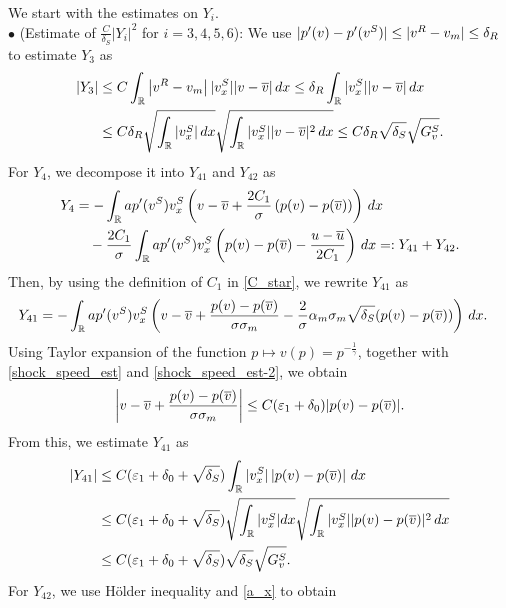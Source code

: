 \documentclass[11pt,reqno]{amsart}
\begin{document}
We start with the estimates on $Y_i$.\\

\noindent $\bullet$ (Estimate of $\frac{C}{\delta_S} |Y_i|^2$ for $i=3,4,5,6$): We use $|p'(v)-p'(v^S)| \le |v^R-v_m| \le \delta_R  $ to estimate $Y_3$ as
\begin{align*}
    |Y_3| &\le C \int_\mathbb{R} \left| v^R-v_m \right| |v^S_x| |v-\overline{v}| \, dx  \le \delta_R \int_\mathbb{R} |v^S_x||v-\overline{v}| \, dx \\ 
    &\le C \delta_R \sqrt{\int_\mathbb{R} |v^S_x| \, dx}\sqrt{\int_\mathbb{R} |v^S_x| |v-\overline{v}|^2 \, dx } \le C \delta_R \sqrt{\delta_S}\sqrt{G^S_v }.
\end{align*}
For $Y_4$, we decompose it into $Y_{41}$ and $Y_{42}$ as
\begin{align*}
     Y_4 
     &=-\int_\mathbb{R} a p'(v^S)v^S_x \left(v-\overline{v}+\frac{2C_1}{\sigma} \left( p(v)-p(\overline{v}) \right) \right) \,dx \\&\quad -\frac{2C_1}{\sigma}\int_\mathbb{R} a p'(v^S) v^S_x \left(p(v)-p(\overline{v}) - \frac{u-\overline{u}}{2C_1}\right) \, dx =:Y_{41}+Y_{42}.
\end{align*}
Then, by using the definition of $C_1$ in \eqref{C_star}, we rewrite $Y_{41}$ as
\begin{align*}
    Y_{41} &= - \int_\mathbb{R} ap'(v^S)v^S_x \left( v-\overline{v}+\frac{p(v)-p(\overline{v})}{\sigma\sigma_m}-\frac{2}{\sigma}\alpha_m\sigma_m \sqrt{\delta_S}(p(v)-p(\overline{v})) \right) \, dx. 
\end{align*}
Using Taylor expansion of the function $p \mapsto v(p)=p^{-\frac{1}{\gamma}}$, together with \eqref{shock_speed_est} and \eqref{shock_speed_est-2}, we obtain
\[\left| v-\overline{v}+\frac{p(v)-p(\overline{v})}{\sigma\sigma_m}\right|\le C(\varepsilon_1+\delta_0)|p(v)-p(\overline{v})|. \]
From this, we estimate $Y_{41}$ as 
\begin{align*}
    |Y_{41}| 
    &\le C (\varepsilon_1+\delta_0+\sqrt{\delta_S}) \int_\mathbb{R} |v^S_x| \left|p(v)-p(\overline{v})\right| \,dx \\ 
    &\le C (\varepsilon_1+\delta_0+\sqrt{\delta_S}) \sqrt{\int_\mathbb{R} |v^S_x| dx} \sqrt{\int_\mathbb{R} |v^S_x||p(v)-p(\overline{v})|^2 \, dx} \\
    &\le C(\varepsilon_1+\delta_0+\sqrt{\delta_S})\sqrt{\delta_S} \sqrt{G^S_v} .
\end{align*}
For $Y_{42}$, we use H\"older inequality and \eqref{a_x} to obtain
\end{document}
